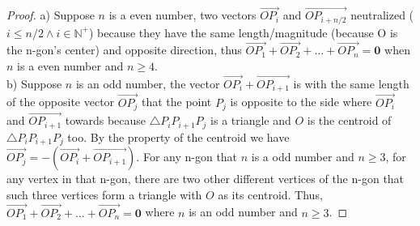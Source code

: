 \documentclass{article}
\begin{document}
\begin{proof}
a) Suppose $n$ is a even number, two vectors $\overrightarrow{OP_i}$ and $\overrightarrow{OP_{i+n/2}}$ neutralized ($i \leq n/2 \wedge i \in \mathbb{N}^+$) because they have the same length/magnitude (because O is the n-gon's center) and opposite direction, thus $\overrightarrow{OP_1} + \overrightarrow{OP_2} + ... + \overrightarrow{OP_n} = \mathbf{0}$ when $n$ is a even number and $n \geq 4$.
\\ b) Suppose $n$ is an odd number, the vector $\overrightarrow{OP_i} + \overrightarrow{OP_{i+1}}$ is with the same length of the opposite vector $\overrightarrow{OP_j}$ that the point $P_j$ is opposite to the side where $\overrightarrow{OP_i}$ and $\overrightarrow{OP_{i+1}}$ towards because $\bigtriangleup P_iP_{i+1}P_j$ is a triangle and $O$ is the centroid of $\bigtriangleup P_iP_{i+1}P_j$ too. By the property of the centroid we have  $\overrightarrow{OP_j} = - (\overrightarrow{OP_i} + \overrightarrow{OP_{i+1}})$. For any n-gon that $n$ is a odd number and $n \geq 3$, for any vertex in that n-gon, there are two other different vertices of the n-gon that such three vertices form a triangle with $O$ as its centroid. Thus, $\overrightarrow{OP_1} + \overrightarrow{OP_2} + ... + \overrightarrow{OP_n} = \mathbf{0}$ where $n$ is an odd number and $n \geq 3$.
\end{proof}
\end{document}
